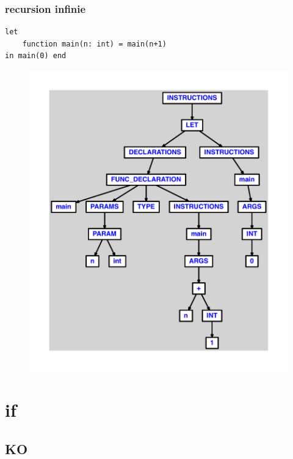\documentclass{article}
\begin{document}
\subsubsection{recursion infinie}
\begin{lstlisting}
let
	function main(n: int) = main(n+1)
in main(0) end
\end{lstlisting}
\newpage
\begin{figure}[H]
\centering
\includegraphics[max width=\textwidth]{ast/ast_247.pdf}
\end{figure}
\newpage
\section{if}
\subsection{KO}
\end{document}
